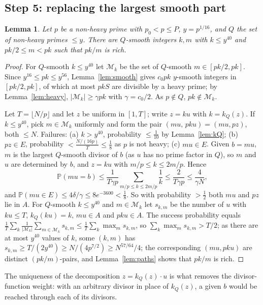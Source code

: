 \documentclass[11pt]{amsart}
\newtheorem{lemma}[theorem]{Lemma}
\theoremstyle{definition}
\theoremstyle{remark}
\newcommand{\PP}{\mathbb{P}}
\newcommand{\abs}[1]{\lvert #1\rvert}
\newcommand{\floor}[1]{\lfloor #1\rfloor}
\newcommand{\cM}{\mathcal{M}}
\begin{document}
\subsection{Step 5: replacing the largest smooth part}
\begin{lemma}\label{lem:core}
Let $p$ be a non-heavy prime with $p_0<p\le P$, $y=p^{1/16}$, and $Q$ the set of non-heavy primes $\le y$. There are $Q$-smooth integers $k,m$ with $k\le y^{40}$ and $pk/2\le m<pk$ such that $pk/m$ is rich.
\end{lemma}
\begin{proof}
For $Q$-smooth $k\le y^{40}$ let $\cM_k$ be the set of $Q$-smooth $m\in[pk/2,pk]$. Since $y^{16}\le pk\le y^{56}$, Lemma~\ref{lem:smooth} gives $c_0pk$ $y$-smooth integers in $[pk/2,pk]$, of which at most $pkS$ are divisible by a heavy prime; by Lemma~\ref{lem:heavy}, $\abs{\cM_k}\ge\gamma pk$ with $\gamma=c_0/2$. As $p\notin Q$, $pk\notin\cM_k$.

Let $T=\floor{N/p}$ and let $z$ be uniform in $[1,T]$; write $z=ku$ with $k=k_Q(z)$. If $k\le y^{40}$, pick $m\in\cM_k$ uniformly and form the pair $(mu,\,pku)=(mu,pz)$, both $\le N$. Failures:
(a) $k>y^{40}$, probability $\le\frac1{10}$ by Lemma~\ref{lem:kQ};
(b) $pz\in E$, probability $<\frac{N/(16p)}{T}\le\frac18$ as $p$ is not heavy;
(c) $mu\in E$. Given $b=mu$, $m$ is the largest $Q$-smooth divisor of $b$ (as $u$ has no prime factor in $Q$), so $m$ and $u$ are determined by $b$, and $z=ku$ with $m/p\le k\le2m/p$. Hence
\[
\PP(mu=b)\le\frac1{T\gamma p}\sum_{m/p\le k\le2m/p}\frac1k\le\frac{2}{T\gamma p}\le\frac4{\gamma N},
\]
and $\PP(mu\in E)\le4\delta/\gamma\le8e^{-3600}<\frac18$.
So with probability $>\frac12$ both $mu$ and $pz$ lie in $A$. For $Q$-smooth $k\le y^{40}$ and $m\in\cM_k$ let $s_{k,m}$ be the number of $u$ with $ku\le T$, $k_Q(ku)=k$, $mu\in A$ and $pku\in A$. The success probability equals $\frac1T\sum_k\frac1{\abs{\cM_k}}\sum_{m\in\cM_k}s_{k,m}\le\frac1T\sum_k\max_{m}s_{k,m}$, so $\sum_k\max_ms_{k,m}>T/2$; as there are at most $y^{40}$ values of $k$, some $(k,m)$ has $s_{k,m}\ge T/(2y^{40})\ge N/(4p^{7/2})\ge N^{57/64}/4$; the corresponding $(mu,pku)$ are distinct $(pk/m)$-pairs, and Lemma~\ref{lem:paths} shows that $pk/m$ is rich.
\end{proof}

The uniqueness of the decomposition $z=k_Q(z)\cdot u$ is what removes the divisor-function weight: with an arbitrary divisor in place of $k_Q(z)$, a given $b$ would be reached through each of its divisors.
\end{document}
